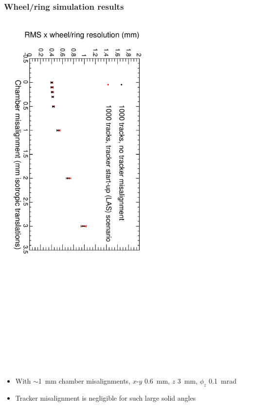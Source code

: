 \documentclass[compress]{beamer}
\begin{document}
\begin{frame}
\frametitle{Wheel/ring simulation results}
\includegraphics[height=\linewidth, angle=90]{vsinternal.pdf}
\begin{itemize}
\item With $\sim$1~mm chamber misalignments, $x$-$y$ 0.6~mm, $z$ 3~mm, $\phi_z$ 0.1~mrad
\item Tracker misalignment is negligible for such large solid angles
\end{itemize}
\end{frame}
\end{document}
